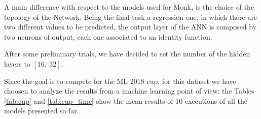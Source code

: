         \begin{table}[H]
            \centering
            \begin{subtable}{\textwidth}
            \end{subtable}
            \caption{Additional time-related statistics for the CUP dataset. The unit of time that has
            been used is the millisecond.}
            \label{tab:cup_time}
        \end{table}

        A main difference with respect to the models used for Monk, is the choice of the topology of the Network.
        Being the final task a regression one, in which there are two different values to be predicted, the output layer of the ANN is composed by two neurons of output, each one associated to an identity function.

        After some preliminary trials, we have decided to set the number of the hidden layers to $[16,\ 32]$.

        Since the goal is to compete for the ML 2018 cup, for this dataset we have choosen to analyze the results from a machine learning point of view: the Tables \ref{tab:cup} and \ref{tab:cup_time}  show the mean results of 10 executions of all the models presented so far.

